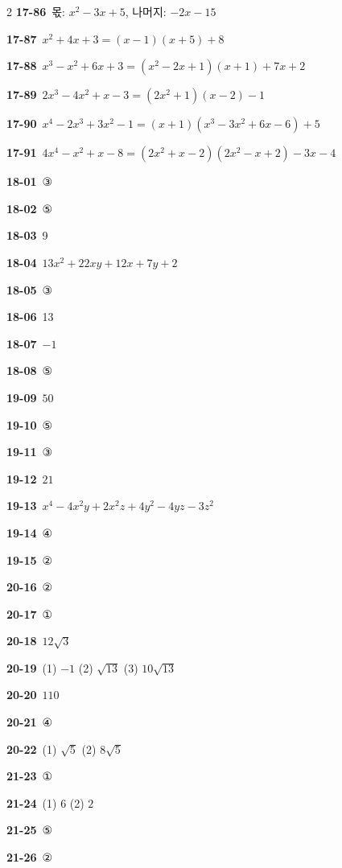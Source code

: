 \documentclass[10pt,a4paper]{article}
\begin{document}
\begin{multicols}{2}
\noindent\textbf{17-86}\ 몫: $x^2-3x+5$, 나머지: $-2x-15$\par
\noindent\textbf{17-87}\ $x^2+4x+3=(x-1)(x+5)+8$\par
\noindent\textbf{17-88}\ $x^3-x^2+6x+3=(x^2-2x+1)(x+1)+7x+2$\par
\noindent\textbf{17-89}\ $2x^3-4x^2+x-3=(2x^2+1)(x-2)-1$\par
\noindent\textbf{17-90}\ $x^4-2x^3+3x^2-1=(x+1)(x^3-3x^2+6x-6)+5$\par
\noindent\textbf{17-91}\ $4x^4-x^2+x-8=(2x^2+x-2)(2x^2-x+2)-3x-4$\par
\noindent\textbf{18-01}\ ③\par
\noindent\textbf{18-02}\ ⑤\par
\noindent\textbf{18-03}\ 9\par
\noindent\textbf{18-04}\ $13x^2+22xy+12x+7y+2$\par
\noindent\textbf{18-05}\ ③\par
\noindent\textbf{18-06}\ 13\par
\noindent\textbf{18-07}\ $-1$\par
\noindent\textbf{18-08}\ ⑤\par
\noindent\textbf{19-09}\ $50$\par
\noindent\textbf{19-10}\ ⑤\par
\noindent\textbf{19-11}\ ③\par
\noindent\textbf{19-12}\ $21$\par
\noindent\textbf{19-13}\ $x^4-4x^2y+2x^2z+4y^2-4yz-3z^2$\par
\noindent\textbf{19-14}\ ④\par
\noindent\textbf{19-15}\ ②\par
\noindent\textbf{20-16}\ ②\par
\noindent\textbf{20-17}\ ①\par
\noindent\textbf{20-18}\ $12\sqrt{3}$\par
\noindent\textbf{20-19}\ (1) $-1$ (2) $\sqrt{13}$ (3) $10\sqrt{13}$\par
\noindent\textbf{20-20}\ $110$\par
\noindent\textbf{20-21}\ ④\par
\noindent\textbf{20-22}\ (1) $\sqrt{5}$ (2) $8\sqrt{5}$\par
\noindent\textbf{21-23}\ ①\par
\noindent\textbf{21-24}\ (1) $6$ (2) $2$\par
\noindent\textbf{21-25}\ ⑤\par
\noindent\textbf{21-26}\ ②\par

\end{multicols}
\end{document}
